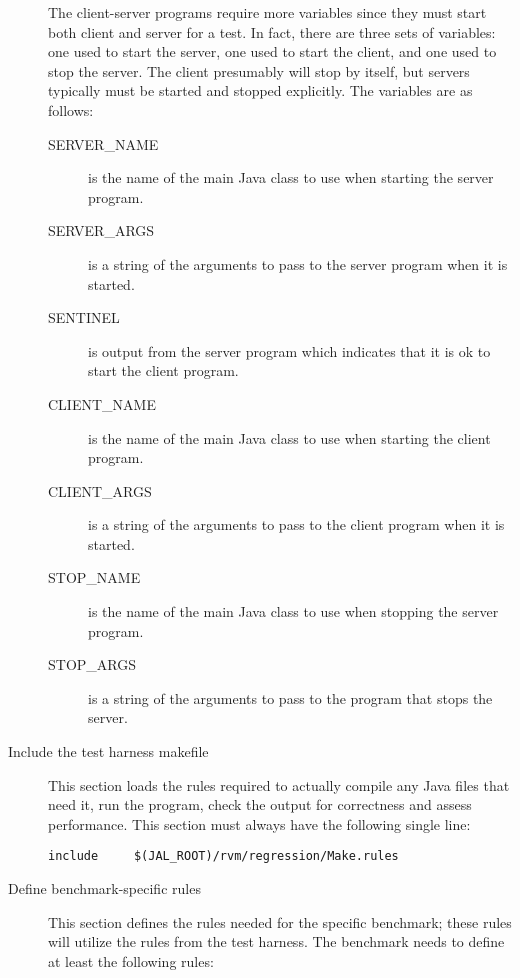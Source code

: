 \begin{description}
 The client-server programs require more variables since they must
start both client and server for a test.  In fact, there are three
sets of variables: one used to start the server, one used to start the
client, and one used to stop the server.  The client presumably will
stop by itself, but servers typically must be started and stopped
explicitly.  The variables are as follows:
\begin{description}
\item[SERVER\_NAME] is the name of the main Java class to use when
starting the server program.
\item[SERVER\_ARGS] is a string of the arguments to pass to the server
program when it is started.
\item[SENTINEL] is output from the server program which indicates that
it is ok to start the client program.
\item[CLIENT\_NAME] is the name of the main Java class to use when
starting the client program.
\item[CLIENT\_ARGS] is a string of the arguments to pass to the client
program when it is started.
\item[STOP\_NAME] is the name of the main Java class to use when
stopping the server program.
\item[STOP\_ARGS] is a string of the arguments to pass to the program
that stops the server.
\end{description}

\item[Include the test harness makefile]  This section loads the rules
required to actually compile any Java files that need it, run the
program, check the output for correctness and assess performance.
This section must always have the following single line:
\begin{verbatim}
include		$(JAL_ROOT)/rvm/regression/Make.rules
\end{verbatim}

\item[Define benchmark-specific rules]  This section defines the rules
needed for the specific benchmark; these rules will utilize the rules
from the test harness.  The benchmark needs to define at least the
following rules:
\begin{description}


\end{description}
\end{description}
